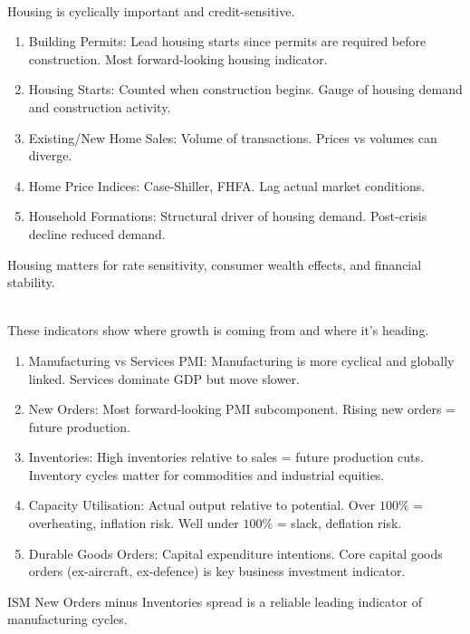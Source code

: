 \documentclass[a4paper,oneside,openany]{book}
\begin{document}
\begin{remark} \\
Housing is cyclically important and credit-sensitive.
\begin{enumerate}[label=\roman*.]
\setlength{\itemsep}{0pt}
\item Building Permits: Lead housing starts since permits are required before construction. Most forward-looking housing indicator.
\item Housing Starts: Counted when construction begins. Gauge of housing demand and construction activity.
\item Existing/New Home Sales: Volume of transactions. Prices vs volumes can diverge.
\item Home Price Indices: Case-Shiller, FHFA. Lag actual market conditions.
\item Household Formations: Structural driver of housing demand. Post-crisis decline reduced demand.
\end{enumerate}
Housing matters for rate sensitivity, consumer wealth effects, and financial stability.
\end{remark}

\begin{remark} \\
These indicators show where growth is coming from and where it's heading.
\begin{enumerate}[label=\roman*.]
\setlength{\itemsep}{0pt}
\item Manufacturing vs Services PMI: Manufacturing is more cyclical and globally linked. Services dominate GDP but move slower.
\item New Orders: Most forward-looking PMI subcomponent. Rising new orders = future production.
\item Inventories: High inventories relative to sales = future production cuts. Inventory cycles matter for commodities and industrial equities.
\item Capacity Utilisation: Actual output relative to potential. Over $100\%$ = overheating, inflation risk. Well under $100\%$ = slack, deflation risk.
\item Durable Goods Orders: Capital expenditure intentions. Core capital goods orders (ex-aircraft, ex-defence) is key business investment indicator.
\end{enumerate}
ISM New Orders minus Inventories spread is a reliable leading indicator of manufacturing cycles.
\end{remark}
\end{document}
